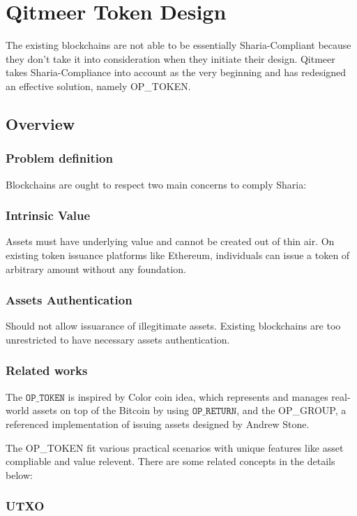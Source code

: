 \documentclass[a4paper,11pt]{article}
\begin{document}
\section{Qitmeer Token Design}
The existing blockchains are not able to be essentially Sharia-Compliant because they don't take it into consideration when they initiate their design. Qitmeer takes Sharia-Compliance into account as the very beginning and has redesigned an effective solution, namely OP\_TOKEN.

\subsection{Overview}
\subsubsection{Problem definition}

Blockchains are ought to respect two main concerns to comply Sharia:

\subsubsection*{Intrinsic Value}
Assets must have underlying value and cannot be created out of thin air. On existing token issuance platforms like Ethereum, individuals can issue a token of arbitrary amount without any foundation. 

\subsubsection*{Assets Authentication}
Should not allow issuarance of illegitimate assets. Existing blockchains are too unrestricted to have necessary assets authentication.
\subsubsection{Related works}

The $\texttt{OP\_TOKEN}$ is inspired by Color coin idea, which represents and manages real-world assets on top of the Bitcoin by using $\texttt{OP\_RETURN}$, and the OP\_GROUP, a referenced implementation of issuing assets designed by Andrew Stone.

The OP\_TOKEN fit various practical scenarios with unique features like asset compliable and value relevent. There are some related concepts in the details below:  

\subsubsection{UTXO}
\end{document}
